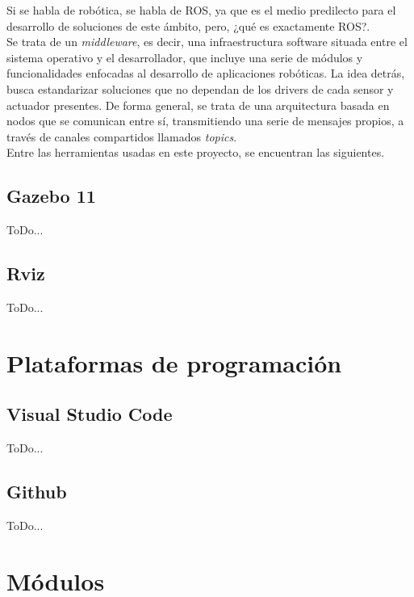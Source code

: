 Si se habla de robótica, se habla de \ac{ROS}, ya que es el medio predilecto para el desarrollo de soluciones de este ámbito, pero, ¿qué es exactamente \ac{ROS}?.\\

Se trata de un \emph{middleware}, es decir, una infraestructura software situada entre el sistema operativo y el desarrollador, que incluye una serie de módulos y funcionalidades enfocadas al desarrollo de aplicaciones robóticas. La idea detrás, busca estandarizar soluciones que no dependan de los drivers de cada sensor y actuador presentes. De forma general, se trata de una arquitectura basada en nodos que se comunican entre sí, transmitiendo una serie de mensajes propios, a través de canales compartidos llamados \emph{topics}.\\

Entre las herramientas usadas en este proyecto, se encuentran las siguientes.

\subsection{Gazebo 11}
\label{subsec:gazebo}

ToDo...

\subsection{Rviz}
\label{subsec:rviz}

ToDo...

\section{Plataformas de programación}
\label{sec:plataformas_de_programacion}

\subsection{Visual Studio Code}
\label{subsec:visual_studio_code}

ToDo...

\subsection{Github}
\label{subsec:github}

ToDo...

\section{Módulos}
\label{sec:modulos}

